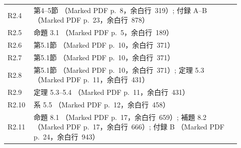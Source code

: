 \begin{longtable}{@{}p{0.09\linewidth}p{0.83\linewidth}@{}}
R2.4 & 第4--5節 （Marked PDF p.~8，余白行~319）; 付録 A--B （Marked PDF p.~23，余白行~878）\\
R2.5 & 命題 3.1 （Marked PDF p.~5，余白行~189）\\
R2.6 & 第5.1節 （Marked PDF p.~10，余白行~371）\\
R2.7 & 第5.1節 （Marked PDF p.~10，余白行~371）\\
R2.8 & 第5.1節 （Marked PDF p.~10，余白行~371）; 定理 5.3 （Marked PDF p.~11，余白行~431）\\
R2.9 & 定理 5.3--5.4 （Marked PDF p.~11，余白行~431）\\
R2.10 & 系 5.5 （Marked PDF p.~12，余白行~458）\\
R2.11 & 命題 8.1 （Marked PDF p.~17，余白行~659）; 補題 8.2 （Marked PDF p.~17，余白行~666）; 付録 B （Marked PDF p.~24，余白行~943）\\
\bottomrule
\end{longtable}
\endgroup
